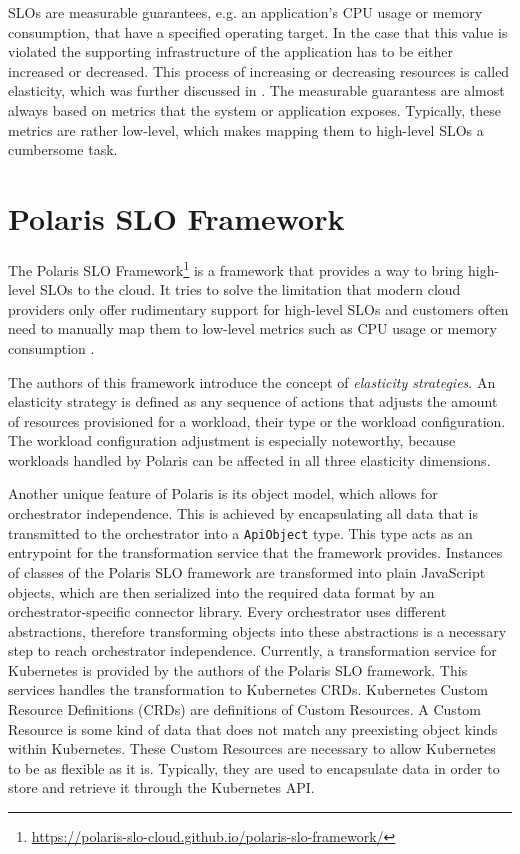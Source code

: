 SLOs are measurable guarantees, e.g. an application's CPU usage or memory consumption, that have a specified operating target. In the case that this value is violated the supporting infrastructure of the application has to be either increased or decreased. This process of increasing or decreasing resources is called elasticity, which was further discussed in . The measurable guarantess are almost always based on metrics that the system or application exposes. Typically, these metrics are rather low-level, which makes mapping them to high-level SLOs a cumbersome task.

\section{Polaris SLO Framework}
\label{sec:polaris}

The Polaris SLO Framework\footnote{\url{https://polaris-slo-cloud.github.io/polaris-slo-framework/}} is a framework that provides a way to bring high-level SLOs to the cloud. It tries to solve the limitation that modern cloud providers only offer rudimentary support for high-level SLOs and customers often need to manually map them to low-level metrics such as CPU usage or memory consumption \cite{pusztaiSLOScriptNovel2021}.

The authors of this framework introduce the concept of \textit{elasticity strategies}. An elasticity strategy is defined as any sequence of actions that adjusts the amount of resources provisioned for a workload, their type or the workload configuration. The workload configuration adjustment is especially noteworthy, because workloads handled by Polaris can be affected in all three elasticity dimensions.

Another unique feature of Polaris is its object model, which allows for orchestrator independence. This is achieved by encapsulating all data that is transmitted to the orchestrator into a \texttt{ApiObject} type. This type acts as an entrypoint for the transformation service that the framework provides. Instances of classes of the Polaris SLO framework are transformed into plain JavaScript objects, which are then serialized into the required data format by an orchestrator-specific connector library. Every orchestrator uses different abstractions, therefore transforming objects into these abstractions is a necessary step to reach orchestrator independence. Currently, a transformation service for Kubernetes is provided by the authors of the Polaris SLO framework. This services handles the transformation to Kubernetes CRDs. Kubernetes Custom Resource Definitions (CRDs) are definitions of Custom Resources. A Custom Resource is some kind of data that does not match any preexisting object kinds within Kubernetes. These Custom Resources are necessary to allow Kubernetes to be as flexible as it is. Typically, they are used to encapsulate data in order to store and retrieve it through the Kubernetes API.

